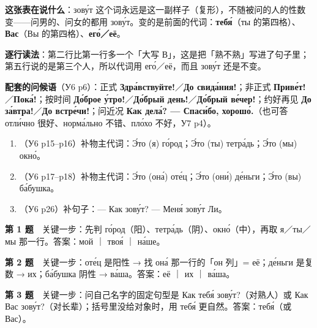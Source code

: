 \textbf{这张表在说什么}：зову́т 这个词永远是这一副样子（复形），不随被问的人的性数变——问男的、问女的都用 зову́т。变的是前面的代词：\textbf{тебя́}（ты 的第四格）、\textbf{Вас}（Вы 的第四格）、\textbf{его́／её}。

\textbf{逐行读法}：第二行比第一行多一个「大写 В」，这是把「熟不熟」写进了句子里；第五行说的是第三个人，所以代词用 его́／её，而且 зову́т 还是不变。

\textbf{配套的问候语}（У6 p6）：正式 \textbf{Здра́вствуйте!}／\textbf{До свида́ния!}；非正式 \textbf{Приве́т!}／\textbf{Пока́!}；按时间 \textbf{До́брое у́тро!}／\textbf{До́брый день!}／\textbf{До́брый ве́чер!}；约好再见 \textbf{До за́втра!}／\textbf{До встре́чи!}；问近况 \textbf{Как дела́? — Спаси́бо, хорошо́.}（也可答 отли́чно 很好、норма́льно 不错、пло́хо 不好，У7 p4）。


\begin{enumerate}[label=\textbf{第 \arabic* 题}]
\item （У6 p15--p16）补物主代词：Э́то (я) \blank го́род；Э́то (ты) \blank тетра́дь；Э́то (мы) \blank окно́。
\item （У6 p17--p18）补物主代词：Э́то (она́) \blank оте́ц；Э́то (они́) \blank де́ньги；Э́то (вы) \blank ба́бушка。
\item （У6 p26）补句子：— Как \blank зову́т? — Меня́ зову́т Ли。
\end{enumerate}

\textbf{第 1 题}　关键一步：先判 го́род（阳）、тетра́дь（阴）、окно́（中），再取 я／ты／мы 那一行。答案：мой ｜ твоя́ ｜ на́ше。

\textbf{第 2 题}　关键一步：оте́ц 是阳性 → 找 она́ 那一行的「он 列」= её；де́ньги 是复数 → их；ба́бушка 阴性 → ва́ша。答案：её ｜ их ｜ ва́ша。

\textbf{第 3 题}　关键一步：问自己名字的固定句型是 Как тебя́ зову́т?（对熟人）或 Как Вас зову́т?（对长辈）；括号里没给对象时，用 тебя́ 更自然。答案：тебя́（或 Вас）。
